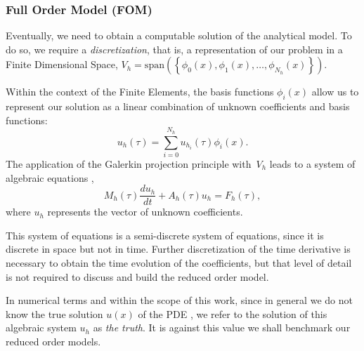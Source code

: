\documentclass[../main.tex]{subfiles}
\begin{document}
\subsubsection{Full Order Model (FOM)}
Eventually, we need to obtain a computable solution of the analytical model. 
To do so, we require a \textit{discretization}, that is, a representation of our problem in a Finite
Dimensional Space, $V_h = \text{span}(\left\{\phi_0(x), \phi_1(x), \ldots, \phi_{N_h}(x)\right\})$.
 
Within the context of the Finite Elements, the basis functions $\phi_i(x)$ allow us to represent our solution as a linear combination of unknown coefficients and basis functions:
\begin{equation*}
    u_h \left(\tau\right) = \sum^{N_h}_{i=0} u_{h_{i}} \left(\tau\right) \phi_i (x).
\end{equation*}
The application of the Galerkin projection principle with~$V_h$ leads to a system of algebraic equations
,
\begin{equation*}
    \label{eq:algebraic_system_fom}
    M_h (\tau) \frac{d u_h}{dt} + A_h (\tau) u_h  = F_h(\tau),
\end{equation*}
where $u_h$ represents the vector of unknown coefficients.

This system of equations is a semi-discrete system of equations, since it is discrete in space but not in time. 
Further discretization of the time derivative is necessary to obtain the time evolution of the coefficients, but that level of detail is not required to discuss and build the reduced order model. 

In numerical terms and within the scope of this work, since in general we do not know the true solution $u(x)$ of the PDE
, we refer to the solution of this algebraic system $u_h$ as \textit{the truth}.
It is against this value we shall benchmark our reduced order models. 
\end{document}
